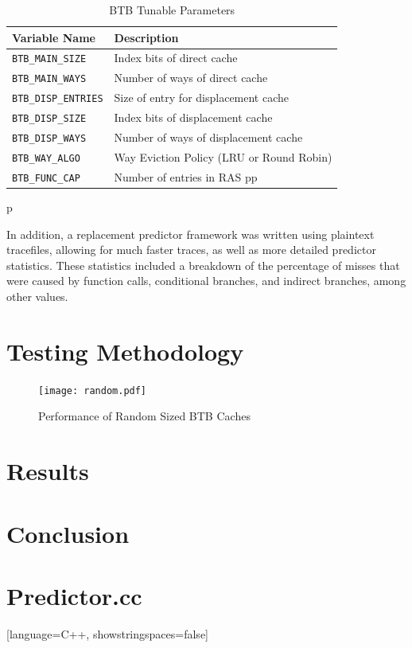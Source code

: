 \documentclass[twocolumn]{article}
\newcommand{\centerimage}[3]{
\begin{figure}[ht!]  
\begin{center}
#1
\caption{#2}
\label{#3}
\end{center}
\end{figure}}
\begin{document}
\begin{table}
\begin{center}\begin{tabular}{p{}p{}}
Variable Name & Description \\
\hline
\texttt{BTB\_MAIN\_SIZE} & Index bits of direct cache \\
\texttt{BTB\_MAIN\_WAYS} & Number of ways of direct cache \\
\texttt{BTB\_DISP\_ENTRIES} & Size of entry for displacement cache \\
\texttt{BTB\_DISP\_SIZE} & Index bits of displacement cache \\
\texttt{BTB\_DISP\_WAYS} & Number of ways of displacement cache \\
\texttt{BTB\_WAY\_ALGO} & Way Eviction Policy (LRU or Round Robin) \\
\texttt{BTB\_FUNC\_CAP} & Number of entries in RAS pp
\end{tabular}\end{center}
\caption{BTB Tunable Parameters}
p\label{envars}
\end{table}

In addition, a replacement predictor framework was written using
plaintext tracefiles, allowing for much faster traces, as well as more
detailed predictor statistics. These statistics included a breakdown of
the percentage of misses that were caused by function calls,
conditional branches, and indirect branches, among other values. 

\section{Testing Methodology}
\centerimage{\texttt{[image: random.pdf]}}{Performance
  of Random Sized BTB Caches}{bgraph}
\section{Results}
\section{Conclusion}
\newpage
\onecolumn
\section{Predictor.cc}
[language=C++, showstringspaces=false]
\end{document}

